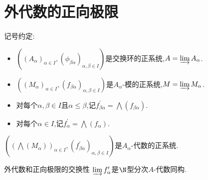 \section{外代数的正向极限}

记号约定:
\begin{itemize}
	\item $\left(\left(A_{\alpha}\right)_{\alpha\in I},\left(\phi_{\beta\alpha}\right)_{\alpha,\beta\in I}\right)$是交换环的正系统,$A=\varinjlim A_{\alpha}$.
	\item $\left(\left(M_{\alpha}\right)_{\alpha\in I},\left(f_{\beta\alpha}\right)_{\alpha,\beta\in I}\right)$是$A_{\alpha}$-模的正系统,$M=\varinjlim M_{\alpha}$.
	\item 对每个$\alpha,\beta\in I$且$\alpha\leq\beta$,记$f_{\beta\alpha}^{\prime}=\bigwedge\left(f_{\beta\alpha}\right)$.
	\item 对每个$\alpha\in I$,记$f_{\alpha}^{\prime}=\bigwedge\left(f_{\alpha}\right)$.
\end{itemize}

\begin{proposition}{}{}
	$\left(\left(\bigwedge\left(M_{\alpha}\right)\right)_{\alpha\in I},\left(f_{\beta\alpha}^{\prime}\right)_{\alpha,\beta\in I}\right)$是$A_{\alpha}$-代数的正系统.
\end{proposition}

\begin{proposition}{外代数和正向极限的交换性}{}
	$\varinjlim f_{\alpha}^{\prime}$是$\N$型分次$A$-代数同构.
\end{proposition}